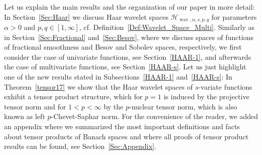 \documentclass[12pt]{article}
\DeclareMathOperator{\wav}{wav}
\begin{document}
Let us explain the main results and the organization of our paper in more detail:
In Section~\ref{Sec:Haar} we discuss Haar wavelet spaces $\mathcal{H}_{\wav, \alpha, s, p,q}$ for parameters $\alpha >0$ and $p,q\in [1,\infty]$, cf. Definition~\ref{Def:Wavelet_Space_Multi}. Similarly as in Section~\ref{Sec:Fractional} and~\ref{Sec:Besov}, where we discuss spaces of functions of fractional smoothness and Besov and Sobolev spaces, respectively, we first consider the case of univariate functions, see Section~\ref{HAAR-1},
and afterwards the case of multivariate functions, see Section~\ref{HAAR-s}.
Let us just highlight one of the new results stated in Subsections~\ref{HAAR-1} and~\ref{HAAR-s}: In Theorem~\ref{tensor17} 
we show that the Haar wavelet spaces of $s$-variate functions exhibit a tensor product structure, which for $p=1$ is induced by the projective tensor norm and for  
$1<p<\infty$ by the $p$-nuclear tensor norm, which is also known as left $p$-Chevet-Saphar norm.
For the convenience of the reader, we added an appendix where we summarized the most important definitions and facts about tensor products of Banach spaces and where all proofs of tensor product results can be found, see Section~\ref{Sec:Appendix}.
\end{document}
